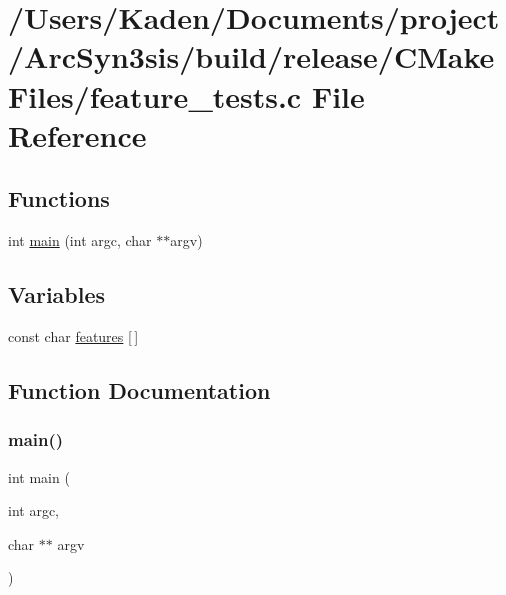 \hypertarget{a00813}{}\section{/\+Users/\+Kaden/\+Documents/project/\+Arc\+Syn3sis/build/release/\+C\+Make\+Files/feature\+\_\+tests.c File Reference}
\label{a00813}
\subsection*{Functions}
\begin{DoxyCompactItemize}
\item 
int \hyperlink{a00813_a3c04138a5bfe5d72780bb7e82a18e627}{main} (int argc, char $\ast$$\ast$argv)
\end{DoxyCompactItemize}
\subsection*{Variables}
\begin{DoxyCompactItemize}
\item 
const char \hyperlink{a00813_a1582568e32f689337602a16bf8a5bff0}{features} \mbox{[}$\,$\mbox{]}
\end{DoxyCompactItemize}


\subsection{Function Documentation}
\mbox{\label{a00813_a3c04138a5bfe5d72780bb7e82a18e627}} 
\subsubsection{\texorpdfstring{main()}{main()}}
{\footnotesize\ttfamily int main (\begin{DoxyParamCaption}\item[{int}]{argc,  }\item[{char $\ast$$\ast$}]{argv }\end{DoxyParamCaption})}



